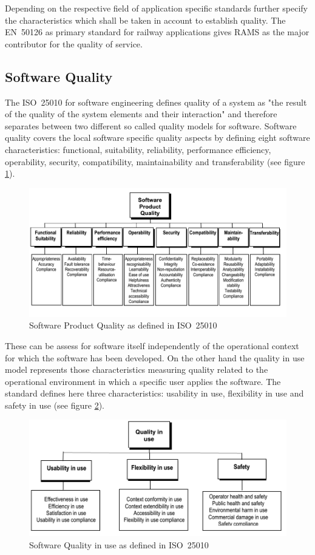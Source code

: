 \documentclass{template/openetcs_report}
\begin{document}
Depending on the respective field of application specific standards further specify the characteristics which shall be taken in account to establish quality. The EN~50126 as primary standard for railway applications gives RAMS as the major contributor for the quality of service. 

\subsection{Software Quality}

The ISO~25010 for software engineering defines quality of a system as "the result of the quality of the system elements and their interaction" and therefore separates between two different so called quality models for software. Software quality covers the local software specific quality aspects by defining eight software characteristics: functional, suitability, reliability, performance efficiency, operability, security, compatibility, maintainability and transferability (see figure \ref{fig:Software-Product-Quality-eng}).

\begin{figure}[htbp]
\centering
\includegraphics[width=0.8\linewidth]{Software-Product-Quality-eng}
\caption{Software Product Quality as defined in ISO~25010}
\label{fig:Software-Product-Quality-eng}
\end{figure}


These can be assess for software itself independently of the operational  context for which the software has been developed. On the other hand the quality in use model represents those characteristics measuring quality related to the operational environment in which a specific user applies the software. The standard defines here three characteristics: 
usability in use, flexibility in use and safety in use (see figure \ref{fig:Software-Quality-in-use}).

\begin{figure}[htbp]
\centering
\includegraphics[width=0.7\linewidth]{Software-Quality-in-use}
\caption{Software Quality in use as defined in ISO~25010}
\label{fig:Software-Quality-in-use}
\end{figure}
\end{document}

